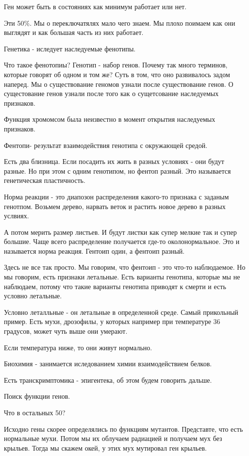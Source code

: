 Ген может быть в состояниях как минимум работает или нет.

Эти 50\%. Мы о переключатялях мало чего знаем. Мы
плохо поимаем как они выглядят и как большая часть из них
работает.

Генетика - иследует наследуемые фенотипы.

Что такое фенотопиы? Генотип - набор генов. 
Почему так много терминов, которые говорят об одном и том же? 
Суть в том, что оно развивалось задом наперед. Мы о существование 
геномов узнали после существование генов. О сущестование генов 
узнали после того как о сущетсование наследуемых признаков. 

Функция хромомсом была неизвестно в момент открытия наследуемых 
признаков. 

Фентопи- результат взаимодействия генотипа с окружающей средой. 

Есть два близница. Если посадить их жить в разных 
условиях - они будут разные. Но при этом с одним генотипом, 
но фентоп разный. Это называется 
генетическая пластичность. 

Норма реакции - это диапозон распределения какого-то признака 
с заданым генотпом. Возьмем дерево, нарвать веток и 
растить новое дерево в разных услвиях. 

А потом мерить размер листьев. И будут листки как супер мелкие 
так и супер большие. Чаще всего распределение получается 
где-то околонормальное. Это и называется норма реакция. Гентоип один, 
а фентоип разный. 

Здесь не все так просто. Мы говорим, что фентоип - это что-то наблюдаемое. 
Но мы говорим, есть признаки летальные. Есть 
варианты генотипа, которые мы не наблюдаем, потому что 
такие варианты генотипа приводят к смерти и есть условно летальные. 

Условно леталльные - он летальные в определенной среде. Самый 
прикольный пример. Есть мухи, дрозофилы, у которых например 
при температуре 36 градусов, может чуть выше они умерают. 

Если температура ниже, то они живут нормально. 

Биохимия - занимается иследованием химии взаимодействием белков. 

Есть транскримптомика - 
эпигентека, об этом будем говорить дальше. 

Поиск функции генов. 

Что в остальных 50?  

Исходно гены скорее определялись по функциям мутантов.
Представте, что есть нормальные мухи. Потом мы их облучаем
радиацией и получаем мух без крыльев. Тогда
мы скажем окей, у этих мух
мутировал ген крыльев.

